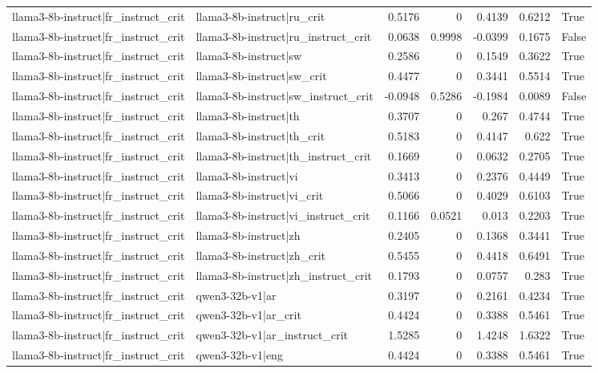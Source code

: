 \begin{table}
\begin{tabular}{l l r r r r l}
llama3-8b-instruct|fr_instruct_crit & llama3-8b-instruct|ru_crit & 0.5176 & 0 & 0.4139 & 0.6212 & True \\
llama3-8b-instruct|fr_instruct_crit & llama3-8b-instruct|ru_instruct_crit & 0.0638 & 0.9998 & -0.0399 & 0.1675 & False \\
llama3-8b-instruct|fr_instruct_crit & llama3-8b-instruct|sw & 0.2586 & 0 & 0.1549 & 0.3622 & True \\
llama3-8b-instruct|fr_instruct_crit & llama3-8b-instruct|sw_crit & 0.4477 & 0 & 0.3441 & 0.5514 & True \\
llama3-8b-instruct|fr_instruct_crit & llama3-8b-instruct|sw_instruct_crit & -0.0948 & 0.5286 & -0.1984 & 0.0089 & False \\
llama3-8b-instruct|fr_instruct_crit & llama3-8b-instruct|th & 0.3707 & 0 & 0.267 & 0.4744 & True \\
llama3-8b-instruct|fr_instruct_crit & llama3-8b-instruct|th_crit & 0.5183 & 0 & 0.4147 & 0.622 & True \\
llama3-8b-instruct|fr_instruct_crit & llama3-8b-instruct|th_instruct_crit & 0.1669 & 0 & 0.0632 & 0.2705 & True \\
llama3-8b-instruct|fr_instruct_crit & llama3-8b-instruct|vi & 0.3413 & 0 & 0.2376 & 0.4449 & True \\
llama3-8b-instruct|fr_instruct_crit & llama3-8b-instruct|vi_crit & 0.5066 & 0 & 0.4029 & 0.6103 & True \\
llama3-8b-instruct|fr_instruct_crit & llama3-8b-instruct|vi_instruct_crit & 0.1166 & 0.0521 & 0.013 & 0.2203 & True \\
llama3-8b-instruct|fr_instruct_crit & llama3-8b-instruct|zh & 0.2405 & 0 & 0.1368 & 0.3441 & True \\
llama3-8b-instruct|fr_instruct_crit & llama3-8b-instruct|zh_crit & 0.5455 & 0 & 0.4418 & 0.6491 & True \\
llama3-8b-instruct|fr_instruct_crit & llama3-8b-instruct|zh_instruct_crit & 0.1793 & 0 & 0.0757 & 0.283 & True \\
llama3-8b-instruct|fr_instruct_crit & qwen3-32b-v1|ar & 0.3197 & 0 & 0.2161 & 0.4234 & True \\
llama3-8b-instruct|fr_instruct_crit & qwen3-32b-v1|ar_crit & 0.4424 & 0 & 0.3388 & 0.5461 & True \\
llama3-8b-instruct|fr_instruct_crit & qwen3-32b-v1|ar_instruct_crit & 1.5285 & 0 & 1.4248 & 1.6322 & True \\
llama3-8b-instruct|fr_instruct_crit & qwen3-32b-v1|eng & 0.4424 & 0 & 0.3388 & 0.5461 & True \\

\end{tabular}
\end{table}
